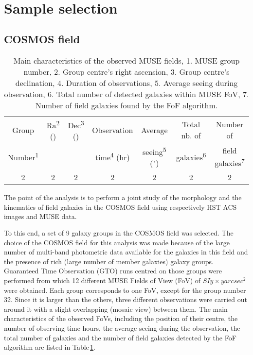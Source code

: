 \clearpage
\section{Sample selection}
\label{sec:Sample_selection}

\subsection{COSMOS field}

\begin{table}[htbp]
	\begin{tabular}{|c|c|c|c|c|c|c|}
	\hline
	Group & Ra\textsuperscript{2} (\degree) & Dec\textsuperscript{3} (\degree) & Observation  & Average & Total nb. of & Number of \\
	
	Number\textsuperscript{1} &  &  & time\textsuperscript{4} (hr) & seeing\textsuperscript{5} (") & galaxies\textsuperscript{6} & field galaxies\textsuperscript{7} \\	
	
	\hline
	2 & 2 & 2 & 2 & 2 & 2 & 2 \\
	\hline
	\end{tabular}
\caption[Main characteristics of the observed MUSE fields]{\label{table:MUSEfieldsProp}Main characteristics of the observed MUSE fields, 1. MUSE group number, 2. Group centre's right ascension, 3. Group centre's declination, 4. Duration of observations, 5. Average seeing during observation, 6. Total number of detected galaxies within MUSE FoV, 7. Number of field galaxies found by the FoF algorithm.}
\end{table}

The point of the analysis is to perform a joint study of the morphology and the kinematics of field galaxies in the COSMOS field using respectively HST ACS images and MUSE data. 

To this end, a set of 9 galaxy groups in the COSMOS field was selected. The choice of the COSMOS field for this analysis was made because of the large number of multi-band photometric data available for the galaxies in this field and the presence of rich (large number of member galaxies) galaxy groups.\\

Guaranteed Time Observation (GTO) runs centred on those groups were performed from which 12 different MUSE Fields of View (FoV) of $SI{y \times y}{arcsec^2} $ were obtained. Each group corresponds to one FoV, except for the group number 32. Since it is larger than the others, three different observations were carried out around it with a slight overlapping (mosaic view) between them. The main characteristics of the observed FoVs, including the position of their centre, the number of observing time hours, the average seeing during the observation, the total number of galaxies and the number of field galaxies detected by the FoF algorithm are listed in Table\,\ref{table:MUSEfieldsProp}.

